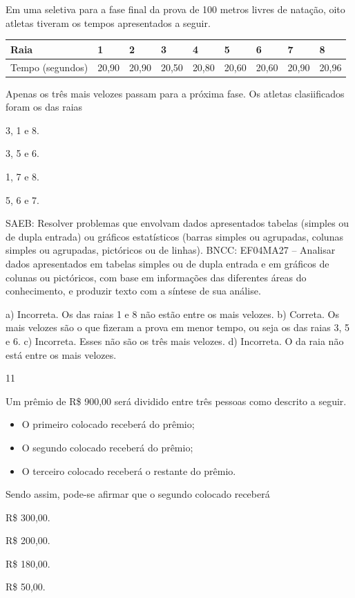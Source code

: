 \begin{mdframed}[linewidth=2pt,linecolor=salmao,roundcorner=2pt]
\begin{escolha}
{\begin{escolha}
Em uma seletiva para a fase final da prova de 100 metros livres de
natação, oito atletas tiveram os tempos apresentados a seguir.

\begin{longtable}[]{@{}ll@{}}
\toprule
Raia & 1 & 2 & 3 & 4 & 5 & 6 & 7 & 8\tabularnewline
\midrule
\endhead
Tempo (segundos) & 20,90 & 20,90 & 20,50 & 20,80 & 20,60 & 20,60 & 20,90 & 20,96\tabularnewline
\bottomrule
\end{longtable}

Apenas os três mais velozes passam para a próxima fase.
Os atletas clasiificados foram os das raias

\begin{escolha}
\item
  3, 1 e 8.
\item
  3, 5 e 6.
\item
  1, 7 e 8.
\item
  5, 6 e 7.
\end{escolha}

SAEB: Resolver problemas que envolvam dados apresentados tabelas (simples ou
de dupla entrada) ou gráficos estatísticos (barras simples ou agrupadas,
colunas simples ou agrupadas, pictóricos ou de linhas).
BNCC: EF04MA27 -- Analisar dados apresentados em tabelas simples ou de dupla entrada e em gráficos de
colunas ou pictóricos, com base em informações das diferentes áreas do conhecimento, e produzir
texto com a síntese de sua análise.

a) Incorreta. Os das raias 1 e 8 não estão entre os mais velozes.
b) Correta. Os mais velozes são o que fizeram a prova em menor tempo, ou seja os das raias 3, 5 e 6.
c) Incorreta. Esses não são os três mais velozes.
d) Incorreta. O da raia não está entre os mais velozes.

\num{11}

Um prêmio de R\$ 900,00 será dividido entre três pessoas como descrito a seguir.

\begin{itemize}
\item
  O primeiro colocado receberá  do prêmio;
\item
  O segundo colocado receberá  do prêmio;
\item
  O terceiro colocado receberá o restante do prêmio.
\end{itemize}

Sendo assim, pode-se afirmar que o segundo colocado receberá

\begin{escolha}
\item
  R\$ 300,00.
\item
  R\$ 200,00.
\item
  R\$ 180,00.
\item
  R\$ 50,00.
\end{escolha}


\end{escolha}}
\end{escolha}
\end{mdframed}
